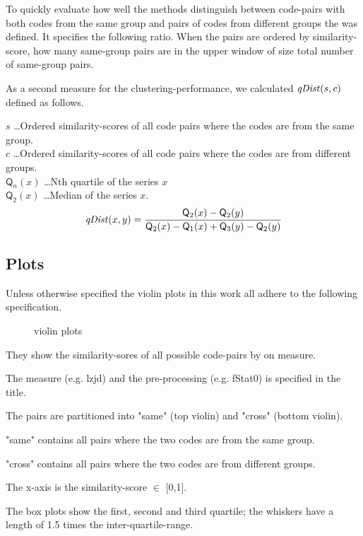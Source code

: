 \documentclass[../main.tex]{subfiles}
\begin{document}
To quickly evaluate how well the methods distinguish between code-pairs with both codes from the same group and pairs of codes from different groups the  was defined.
It specifies the following ratio.
When the pairs are ordered by similarity-score, how many same-group pairs are in the upper window of size total number of same-group pairs.

As a second measure for the clustering-performance, we calculated $\mbox{\textit{qDist}}(s,c)$ defined as follows.

$s$ \dots Ordered similarity-scores of all code pairs where the codes are from the same group.\\
$c$ \dots Ordered similarity-scores of all code pairs where the codes are from different groups.\\
$\mathsf{Q}_n(x)$ \dots Nth quartile of the series $x$\\
$\mathsf{Q}_2(x)$ \dots Median of the series $x$.
\begin{equation}
  \mbox{\textit{qDist}}(x,y) = \dfrac{\mathsf{Q}_2(x) - \mathsf{Q}_2(y)}{\mathsf{Q}_2(x) - \mathsf{Q}_1(x) + \mathsf{Q}_3(y) - \mathsf{Q}_2(y)}
  \label{eq:qDist}
\end{equation}

\subsection{Plots}

Unless otherwise specified the violin plots  in this work all adhere to the following specification.

\begin{figure}[ht!]
  \centering

  \caption{violin plots}
  \label{fig:violins}
\end{figure}

\begin{ul}
  \item They show the similarity-sores of all possible code-pairs by on measure.
  \item The measure (e.g. lzjd) and the pre-processing (e.g. fStat0) is specified in the title.
  \item The pairs are partitioned into "same" (top violin) and "cross" (bottom violin).
  \item "same" contains all pairs where the two codes are from the same group.
  \item "cross" contains all pairs where the two codes are from different groups.
  \item The x-axis is the similarity-score $\in$ [0,1].
  \item The box plots show the first, second and third quartile; the whiskers have a length of 1.5 times the inter-quartile-range.
\end{ul}
\end{document}
